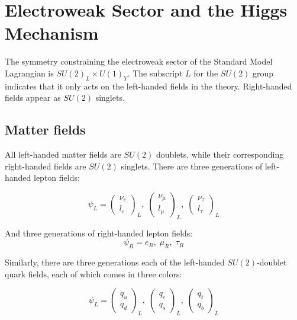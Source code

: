 \section{Electroweak Sector and the Higgs Mechanism}\label{sec:sm_ew}

The symmetry constraining the electroweak sector of the Standard Model Lagrangian is $SU(2)_L \times U(1)_Y$.
The subscript $L$ for the $SU(2)$ group indicates that it only acts on the left-handed fields in the theory.
Right-handed fields appear as $SU(2)$ singlets.

\subsection{Matter fields}\label{subsec:ew_fields}

All left-handed matter fields are $SU(2)$ doublets, while their corresponding right-handed fields are $SU(2)$ singlets.
There are three generations of left-handed lepton fields:

\begin{equation}\label{eq:left_handed_leptons}
    \psi_L =
    \begin{pmatrix}
        \nu_e \\ l_e
    \end{pmatrix}_L,\;
    \begin{pmatrix}
        \nu_{\mu} \\ l_{\mu}
    \end{pmatrix}_L,\;
     \begin{pmatrix}
        \nu_{\tau} \\ l_{\tau}
    \end{pmatrix}_L
\end{equation}

And three generations of right-handed lepton fields:
\begin{equation}\label{eq:right_handed_leptons}
\psi_R = e_R,\; \mu_R,\; \tau_R
\end{equation}

Similarly, there are three generations each of the left-handed $SU(2)$-doublet quark fields,
each of which comes in three colors:

\begin{equation}\label{eq:left_handed_quarks}
   \psi_L =
    \begin{pmatrix}
        q_u \\ q_d
    \end{pmatrix}_L,\;
    \begin{pmatrix}
        q_{c} \\ q_{s}
    \end{pmatrix}_L,\;
     \begin{pmatrix}
        q_{t} \\ q_{b}
    \end{pmatrix}_L
\end{equation}

